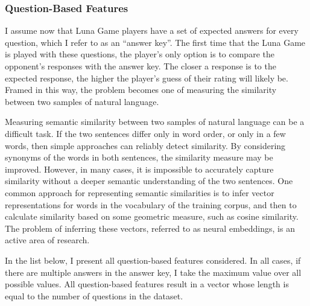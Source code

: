 \subsubsection{Question-Based Features}
I assume now that Luna Game players have a set of expected answers for every question, which I refer to as an ``answer key''. The first time that the Luna Game is played with these questions, the player's only option is to compare the opponent's responses with the answer key. The closer a response is to the expected response, the higher the player's guess of their rating will likely be. Framed in this way, the problem becomes one of measuring the similarity between two samples of natural language.

Measuring semantic similarity between two samples of natural language can be a difficult task. If the two sentences differ only in word order, or only in a few words, then simple approaches can reliably detect similarity. By considering synonyms of the words in both sentences, the similarity measure may be improved. However, in many cases, it is impossible to accurately capture similarity without a deeper semantic understanding of the two sentences. One common approach for representing semantic similarities is to infer vector representations for words in the vocabulary of the training corpus, and then to calculate similarity based on some geometric measure, such as cosine similarity. The problem of inferring these vectors, referred to as neural embeddings, is an active area of research.

In the list below, I present all question-based features considered. In all cases, if there are multiple answers in the answer key, I take the maximum value over all possible values. All question-based features result in a vector whose length is equal to the number of questions in the dataset.


